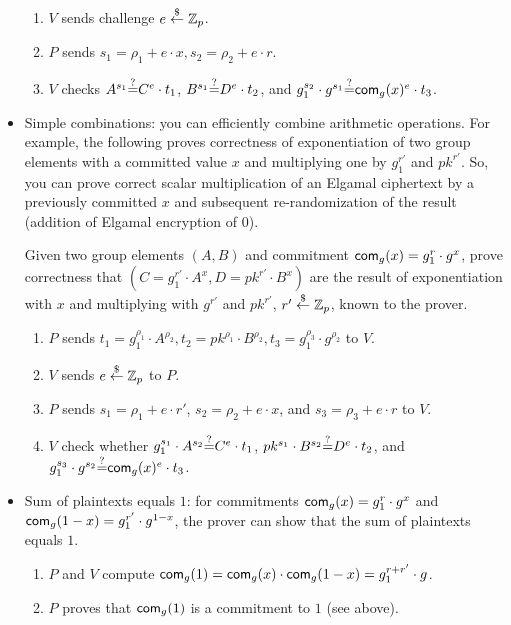\begin{itemize}
\begin{enumerate}
      \item $V$ sends challenge $e\stackrel{\$}{\leftarrow}\mathbb{Z}_p$.

      \item $P$ sends $s_1=\rho_1+e\cdot{}x,s_2=\rho_2+e\cdot{}r$.
        \item $V$ checks $A^{s_1}{\stackrel{?}{=}}{}C^e\cdot{}t_1$,
          $B^{s_1}{\stackrel{?}{=}}{}D^e\cdot{}t_2$, and
          $g_1^{s_2}\cdot{}g^{s_1}{\stackrel{?}{=}}{}\mathsf{com}_g(x)^e\cdot{}t_3$.
          
      \end{enumerate}   

    \item Simple combinations: you can efficiently combine arithmetic
      operations. For example, the following proves correctness of
      exponentiation of two group elements with a committed value $x$
      and multiplying one by $g_1^{r'}$ and $pk^{r'}$. So, you can
      prove correct scalar multiplication of an Elgamal ciphertext by
      a previously committed $x$ and subsequent re-randomization of
      the result (addition of Elgamal encryption of $0$).

      Given two group elements $(A,B)$ and commitment
      $\mathsf{com}_g(x) =g_1^{r}\cdot{}g^x$, prove correctness that
      $(C=g_1^{r'}\cdot{}A^x,D=pk^{r'}\cdot{}B^x)$ are the result of
      exponentiation with $x$ and multiplying with $g^{r'}$ and
      $pk^{r'}$, $r'\stackrel{\$}{\leftarrow}\mathbb{Z}_p$, known to the prover.

\begin{enumerate}
  \item $P$ sends $t_1=g_1^{\rho_1}\cdot{}A^{\rho_2},t_2=pk^{\rho_1}\cdot{}B^{\rho_2},t_3=g_1^{\rho_3}\cdot{}g^{\rho_2}$ to $V$.
  \item $V$ sends $e\stackrel{\$}{\leftarrow}\mathbb{Z}_p$ to $P$.
    \item $P$ sends $s_1=\rho_1+e\cdot{}r'$, $s_2=\rho_2+e\cdot{}x$,
      and $s_3=\rho_3+e\cdot{}r$ to $V$.
\item $V$ check whether $g_1^{s_1}\cdot{}A^{s_2}{\stackrel{?}{=}}{}C^e\cdot{}t_1$,
  $pk^{s_1}\cdot{}B^{s_2}{\stackrel{?}{=}}{}D^e\cdot{}t_2$, and
  $g_1^{s_3}\cdot{}g^{s_2}{\stackrel{?}{=}}{}\mathsf{com}_g(x)^e\cdot{}t_3$.
\end{enumerate}

\item Sum of plaintexts equals $1$: for commitments
  $\mathsf{com}_{g}(x)=g_1^r\cdot{}g^x$ and
  $\mathsf{com}_{g}(1-x)=g_1^{r'}\cdot{}g^{1-x}$, the prover can show that the sum of
  plaintexts equals $1$.

  \begin{enumerate}
  \item $P$ and $V$ compute
    $\mathsf{com}_{g}(1)=\mathsf{com}_{g}(x)\cdot{}\mathsf{com}_{g}(1-x)=g_1^{r+r'}\cdot{}g$.
\item $P$ proves that $\mathsf{com}_{g}(1)$ is a commitment to $1$ (see
  above).
  \end{enumerate}
\end{itemize}




